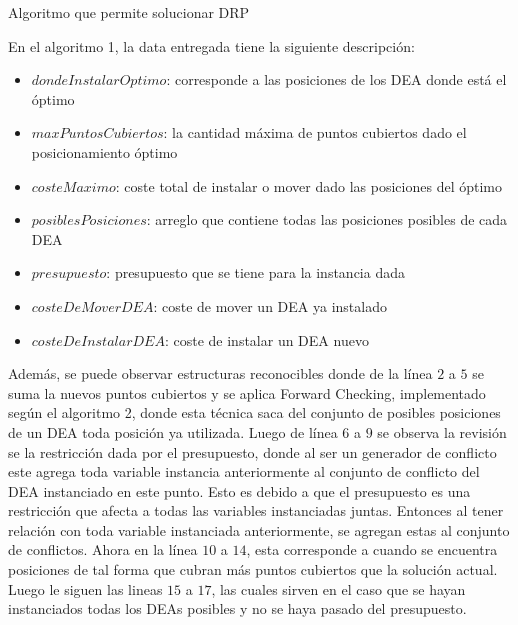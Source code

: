 \documentclass[letter, 10pt]{article}
\begin{document}
\begin{algorithm}[h!]
{{     
        
        
    }
}
\caption{Algoritmo que permite solucionar DRP}
\end{algorithm}

En el algoritmo 1, la data entregada tiene la siguiente descripci\'on:
\begin{itemize}
    \item $dondeInstalarOptimo$: corresponde a las posiciones de los DEA donde est\'a el \'optimo
    \item $maxPuntosCubiertos$: la cantidad m\'axima de puntos cubiertos dado el posicionamiento \'optimo
    \item $costeMaximo$: coste total de instalar o mover dado las posiciones del \'optimo
    \item $posiblesPosiciones$: arreglo que contiene todas las posiciones posibles de cada DEA
    \item $presupuesto$: presupuesto que se tiene para la instancia dada
    \item $costeDeMoverDEA$: coste de mover un DEA ya instalado
    \item $costeDeInstalarDEA$: coste de instalar un DEA nuevo
\end{itemize}

Adem\'as, se puede observar estructuras reconocibles donde de la l\'inea $2$ a $5$ se suma la nuevos puntos cubiertos y se aplica Forward Checking, implementado seg\'un el algoritmo 2, donde esta t\'ecnica saca del conjunto de posibles posiciones de un DEA toda posici\'on ya utilizada. Luego de l\'inea $6$ a $9$ se observa la revisi\'on se la restricci\'on dada por el presupuesto, donde al ser un generador de conflicto este agrega toda variable instancia anteriormente al conjunto de conflicto del DEA instanciado en este punto. Esto es debido a que el presupuesto es una restricci\'on que afecta a todas las variables instanciadas juntas. Entonces al tener relaci\'on con toda variable instanciada anteriormente, se agregan estas al conjunto de conflictos. Ahora en la l\'inea $10$ a $14$, esta corresponde a cuando se encuentra posiciones de tal forma que cubran m\'as puntos cubiertos que la soluci\'on actual. Luego le siguen las lineas $15$ a $17$, las cuales sirven en el caso que se hayan instanciados todas los DEAs posibles y no se haya pasado del presupuesto.
\end{document}
